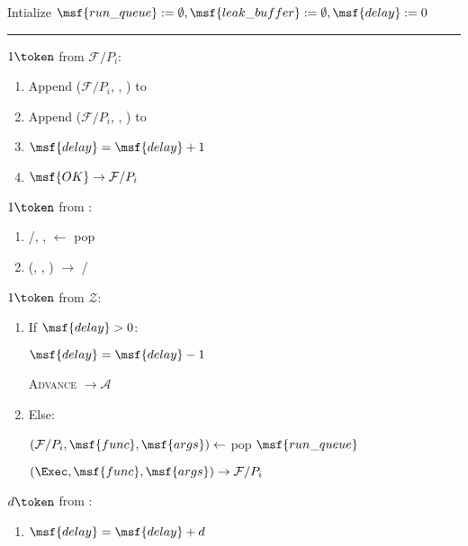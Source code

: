 \begin{bbox}[title={\textbf{Wrapper} $\Wasync$} ] 

Intialize $\msf{run\_queue} := \emptyset, \msf{leak\_buffer} := \emptyset, \msf{delay} := 0$

\vspace{2mm} \hrule \vspace{2mm}

\OnInput {} \color{red} $1 \token$ \color{black} from $\mathcal{F}/P_i$:
	\begin{enumerate}
		\item Append ($\mathcal{F}/P_i$, , ) to 
		\item Append ($\mathcal{F}/P_i$, , ) to 
		\item $\msf{delay} = \msf{delay} + 1$
		\item \Send $\msf{OK} \rightarrow \mathcal{F}/P_i$
	\end{enumerate}


\OnInput {} \color{red} $1 \token$ \color{black} from \Adversary:
	\begin{enumerate}
		\item \F/\Partyi, ,  $\leftarrow$ pop 
		\item \Send (\Exec, , ) $\rightarrow$ \F/\Partyi
	\end{enumerate}

\OnInput {} \color{red} $1 \token$ \color{black} from $\mathcal{Z}$:
	\begin{enumerate}
		\item If $\msf{delay} > 0$:

			\quad  $\msf{delay} = \msf{delay} - 1$

			\quad  \Send \textsc{Advance} $\rightarrow \mathcal{A}$
		\item Else:
			
			\quad $(\mathcal{F}/P_i, \msf{func}, \msf{args}) \leftarrow$ pop $\msf{run\_queue}$

			\quad \Send $(\Exec, \msf{func}, \msf{args}) \rightarrow \mathcal{F}/P_i$
	\end{enumerate}

\OnInput {} \color{red} $d \token$ \color{black} from \Adversary:
	\begin{enumerate}

			\item $\msf{delay} = \msf{delay} + d$


\end{enumerate}
\end{bbox}
